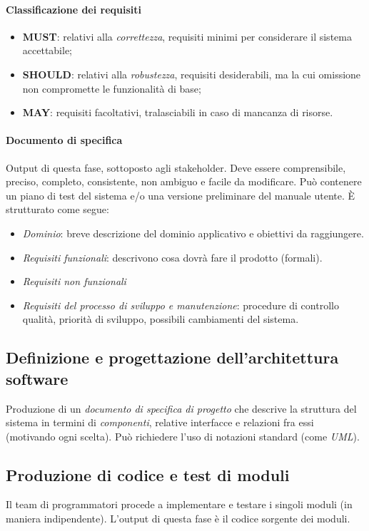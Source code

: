 \paragraph{Classificazione dei requisiti}
\begin{itemize}
    \item \textbf{MUST}: relativi alla \textit{correttezza}, requisiti minimi per considerare il sistema accettabile;
    \item \textbf{SHOULD}: relativi alla \textit{robustezza}, requisiti desiderabili, ma la cui omissione non compromette le funzionalità di base;
    \item \textbf{MAY}: requisiti facoltativi, tralasciabili in caso di mancanza di risorse.
\end{itemize}

\paragraph{Documento di specifica} Output di questa fase, sottoposto agli stakeholder. Deve essere comprensibile, preciso, completo, consistente, non ambiguo e facile da modificare. Può contenere un piano di test del sistema e/o una versione preliminare del manuale utente. È strutturato come segue:
\begin{itemize}
    \item \textit{Dominio}: breve descrizione del dominio applicativo e obiettivi da raggiungere.
    \item \textit{Requisiti funzionali}: descrivono cosa dovrà fare il prodotto (formali).
    \item \textit{Requisiti non funzionali}
    \item \textit{Requisiti del processo di sviluppo e manutenzione}: procedure di controllo qualità, priorità di sviluppo, possibili cambiamenti del sistema.
\end{itemize}

\subsection{Definizione e progettazione dell'architettura software}
Produzione di un \textit{documento di specifica di progetto} che descrive la struttura del sistema in termini di \textit{componenti}, relative interfacce e relazioni fra essi (motivando ogni scelta). Può richiedere l'uso di notazioni standard (come \textit{UML}).

\subsection{Produzione di codice e test di moduli}
Il team di programmatori procede a implementare e testare i singoli moduli (in maniera indipendente). L'output di questa fase è il codice sorgente dei moduli.

